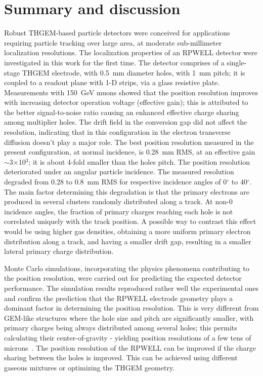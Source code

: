 \section{Summary and discussion}
\label{sec: Summary and discussion}

Robust THGEM-based particle detectors were conceived for applications requiring particle tracking over large area, at moderate sub-millimeter localization resolutions. The localization properties of an RPWELL detector were investigated in this work for the first time. The detector comprises of a single-stage THGEM electrode, with 0.5~mm diameter holes, with 1~mm pitch; it is coupled to a readout plane with 1-D strips, via a glass resistive plate. Measurements with 150~GeV muons showed that the position resolution improves with increasing detector operation voltage (effective gain); this is attributed to the better signal-to-noise ratio causing an enhanced effective charge sharing among multiplier holes. The drift field in the conversion gap did not affect the resolution, indicating that in this configuration in \nech the electron transverse diffusion doesn't play a major role. The best position resolution measured in the present configuration, at normal incidence, is 0.28~mm RMS, at an effective gain $\sim$3$\times$10$^3$; it is about 4-fold smaller than the holes pitch. 
The position resolution deteriorated under an angular particle incidence. The measured resolution degraded from 0.28 to 0.8~mm RMS for respective incidence angles of 0$^\circ$ to 40$^\circ$. The main factor determining this degradation is that the primary electrons are produced in several clusters randomly distributed along a track. At non-0 incidence angles, the fraction of primary charges reaching each hole is not correlated uniquely with the track position. A possible way to contrast this effect would be using higher gas densities, obtaining a more uniform primary electron distribution along a track, and having a smaller drift gap, resulting in a smaller lateral primary charge distribution.

Monte Carlo simulations, incorporating the physics phenomena contributing to the position resolution, were carried out for predicting the expected detector performance. The simulation results reproduced rather well the experimental ones and confirm the prediction that the RPWELL electrode geometry plays a dominant factor in determining the position resolution.
This is very different from GEM-like structures where the hole size and pitch are significantly smaller, with primary charges being always distributed among several holes; this permits calculating their center-of-gravity - yielding position resolutions of a few tens of microns~\cite{lener2016mu,carnegie2005resolution}. 
The position resolution of the RPWELL can be improved if the charge sharing between the holes is improved. This can be achieved using different gaseous mixtures or optimizing the THGEM geometry. 